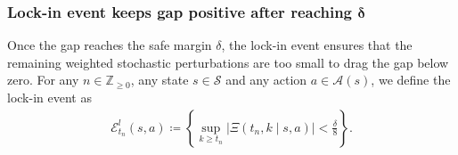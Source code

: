 
\subsubsection{Lock-in event keeps gap positive after reaching $\bm{\delta}$}

Once the gap reaches the safe margin $\delta$, the lock-in event ensures that the remaining weighted stochastic perturbations are too small to drag the gap below zero.
For any $n \in \mathbb Z_{\ge 0}$,
any state $s \in \mathcal S$
and any action $a \in \mathcal A(s)$,
we define the lock-in event as
\begin{align}
    \mathcal E^l_{t_n}(s,a) \coloneqq \left\{ \sup_{k \ge t_n} \bigl| \Xi(t_n, k \mid s,a) \bigr| < \frac{\delta}{8} \right\} .
\end{align}

